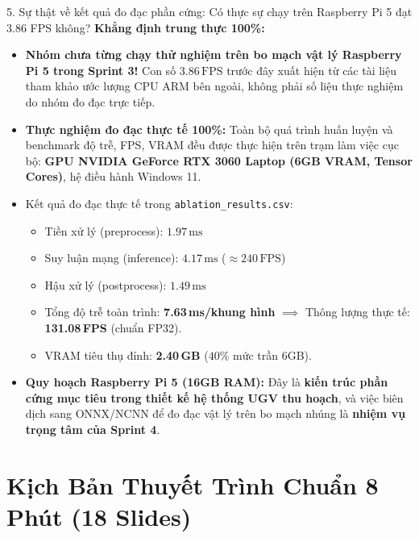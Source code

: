 \documentclass[11pt,a4paper]{article}
\begin{document}
\begin{qbox}{5. Sự thật về kết quả đo đạc phần cứng: Có thực sự chạy trên Raspberry Pi 5 đạt 3.86 FPS không?}
\textbf{Khẳng định trung thực 100\%:}
\begin{itemize}[leftmargin=1.5em]
    \item \textbf{Nhóm chưa từng chạy thử nghiệm trên bo mạch vật lý Raspberry Pi 5 trong Sprint 3!} Con số $3.86\,\text{FPS}$ trước đây xuất hiện từ các tài liệu tham khảo ước lượng CPU ARM bên ngoài, không phải số liệu thực nghiệm do nhóm đo đạc trực tiếp.
    \item \textbf{Thực nghiệm đo đạc thực tế 100\%:} Toàn bộ quá trình huấn luyện và benchmark độ trễ, FPS, VRAM đều được thực hiện trên trạm làm việc cục bộ: \textbf{GPU NVIDIA GeForce RTX 3060 Laptop (6GB VRAM, Tensor Cores)}, hệ điều hành Windows 11.
    \item Kết quả đo đạc thực tế trong \texttt{ablation\_results.csv}:
    \begin{itemize}
        \item Tiền xử lý (preprocess): $1.97\,\text{ms}$
        \item Suy luận mạng (inference): $4.17\,\text{ms}$ ($\approx 240\,\text{FPS}$)
        \item Hậu xử lý (postprocess): $1.49\,\text{ms}$
        \item Tổng độ trễ toàn trình: \textbf{7.63\,ms/khung hình} $\implies$ Thông lượng thực tế: \textbf{131.08\,FPS} (chuẩn FP32).
        \item VRAM tiêu thụ đỉnh: \textbf{2.40\,GB} ($40\%$ mức trần 6GB).
    \end{itemize}
    \item \textbf{Quy hoạch Raspberry Pi 5 (16GB RAM):} Đây là \textbf{kiến trúc phần cứng mục tiêu trong thiết kế hệ thống UGV thu hoạch}, và việc biên dịch sang ONNX/NCNN để đo đạc vật lý trên bo mạch nhúng là \textbf{nhiệm vụ trọng tâm của Sprint 4}.
\end{itemize}
\end{qbox}

\newpage

\section{Kịch Bản Thuyết Trình Chuẩn 8 Phút (18 Slides)}
\label{sec:script8min}
\end{document}
